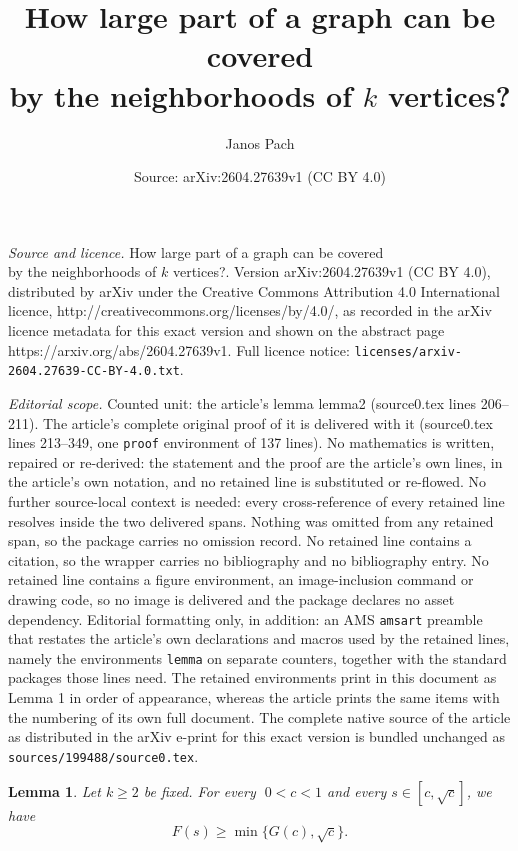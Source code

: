\documentclass[10pt,a4paper]{amsart}
\title{How large part of a graph can be covered\\ by the neighborhoods of $k$ vertices?}
\author{Janos Pach}
\date{Source: arXiv:2604.27639v1 (CC BY 4.0)}
\newtheorem{lemma}{Lemma}
\begin{document}
\maketitle

\noindent\emph{Source and licence.} How large part of a graph can be covered\\ by the neighborhoods of $k$ vertices?. Version arXiv:2604.27639v1 (CC BY 4.0), distributed by arXiv under the Creative Commons Attribution 4.0 International licence, http://creativecommons.org/licenses/by/4.0/, as recorded in the arXiv licence metadata for this exact version and shown on the abstract page https://arxiv.org/abs/2604.27639v1. Full licence notice: \texttt{licenses/arxiv-2604.27639-CC-BY-4.0.txt}.\par\smallskip

\noindent\textit{Editorial scope.} Counted unit: the article's lemma lemma2 (source0.tex lines 206--211). The article's complete original proof of it is delivered with it (source0.tex lines 213--349, one \texttt{proof} environment of 137 lines). No mathematics is written, repaired or re-derived: the statement and the proof are the article's own lines, in the article's own notation, and no retained line is substituted or re-flowed.  No further source-local context is needed: every cross-reference of every retained line resolves inside the two delivered spans.  Nothing was omitted from any retained span, so the package carries no omission record.  No retained line contains a citation, so the wrapper carries no bibliography and no bibliography entry.  No retained line contains a figure environment, an image-inclusion command or drawing code, so no image is delivered and the package declares no asset dependency.  Editorial formatting only, in addition: an AMS \texttt{amsart} preamble that restates the article's own declarations and macros used by the retained lines, namely the environments \texttt{lemma} on separate counters, together with the standard packages those lines need.  The retained environments print in this document as Lemma 1 in order of appearance, whereas the article prints the same items with the numbering of its own full document.  The complete native source of the article as distributed in the arXiv e-print for this exact version is bundled unchanged as \texttt{sources/199488/source0.tex}.
\begin{lemma}\label{lemma2}
Let $k\ge 2$ be fixed. For every $\;0<c<1$ and every $s\in[c,\sqrt c]$, we have
\[
F(s)\ge \min\{G(c),\sqrt c\}.
\]
\end{lemma}
\end{document}
